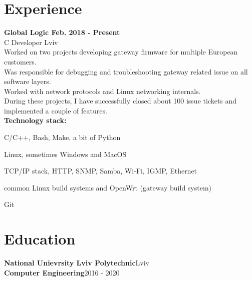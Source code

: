 \documentclass{article}
\begin{document}
\section{Experience}
{\bfseries
Global Logic \hspace*{\fill}Feb. 2018 - Present\\
}
\vspace{0.5em}
C Developer  \hspace*{\fill}Lviv\\
Worked on two projects developing gateway firmware for multiple European customers.\\
Was responsible for debugging and troubleshooting gateway related issue on all software layers.\\
Worked with network protocols and Linux networking internals.\\
During these projects, I have successfully closed about 100 issue tickets and implemented a couple of features.\\

\textbf{Technology stack:}
\begin{description}[align=left,leftmargin=3.8cm,style=multiline]
\item[Languages:] C/C++, Bash, Make, a bit of Python
\item[Operating Systems:] Linux, sometimes Windows and MacOS
\item[Networking:] TCP/IP stack, HTTP, SNMP, Samba, Wi-Fi, IGMP, Ethernet
\item[Build systems:] common Linux build systems and OpenWrt (gateway build system)
\item[VCS:] Git\\
\end{description}

\section{Education}
\textbf{National Unievrsity Lviv Polytechnic}\hspace*{\fill}Lviv\\
\textbf{Computer Engineering}\hspace*{\fill}2016 - 2020
\end{document}
